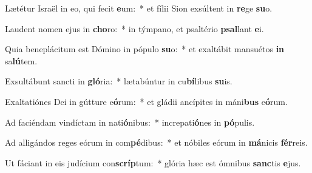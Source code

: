 \item Lætétur Israël in eo, qui fecit \textbf{e}um:~* et fílii Sion exsúltent in \textbf{re}ge \textbf{su}o.
\item Laudent nomen ejus in \textbf{cho}ro:~* in týmpano, et psaltério \textbf{psal}lant \textbf{e}i.
\item Quia beneplácitum est Dómino in pópulo \textbf{su}o:~* et exaltábit mansuétos \textbf{in} sa\textbf{lú}tem.
\item Exsultábunt sancti in \textbf{gló}ria:~* lætabúntur in cu\textbf{bí}libus \textbf{su}is.
\item Exaltatiónes Dei in gútture e\textbf{ó}rum:~* et gládii ancípites in máni\textbf{bus} e\textbf{ó}rum.
\item Ad faciéndam vindíctam in nati\textbf{ó}nibus:~* increpati\textbf{ó}nes in \textbf{pó}pulis.
\item Ad alligándos reges eórum in com\textbf{pé}dibus:~* et nóbiles eórum in \textbf{má}nicis \textbf{fér}reis.
\item Ut fáciant in eis judícium con\textbf{scríp}tum:~* glória hæc est ómnibus \textbf{sanc}tis \textbf{e}jus.
